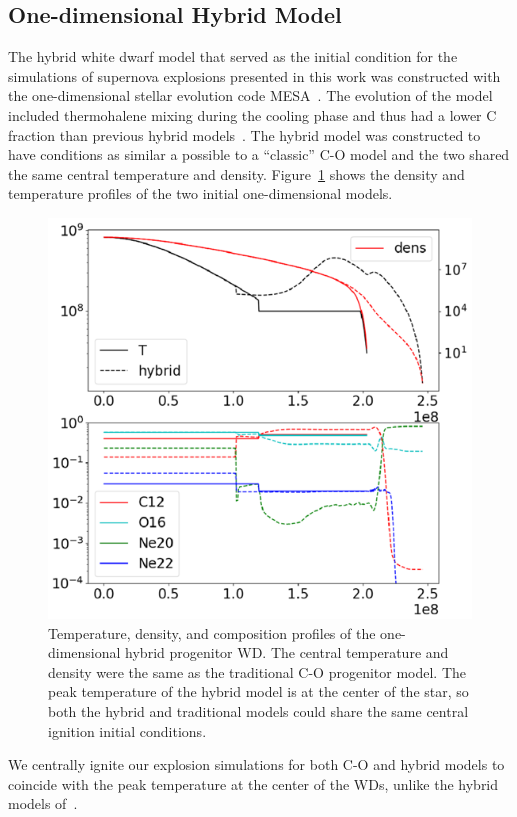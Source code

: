 \documentclass[iop,apj]{emulateapj}
\begin{document}
\subsection{One-dimensional Hybrid Model}

The hybrid white dwarf model that served as the initial condition
for the simulations of supernova explosions presented in this work
was constructed with the one-dimensional stellar evolution code
MESA~\citep{mesa1,mesa2,mesa3,mesa3e}. The evolution of the model
included thermohalene mixing during the cooling phase and thus
had a lower C fraction than previous hybrid models~\citep{brooksetal2017}.
The hybrid model was constructed to have conditions as similar a possible
to a ``classic'' C-O model and the two shared the same central temperature
and density.  Figure~\ref{fig:init_conds} shows the density and temperature
profiles of the two initial one-dimensional models.
\begin{figure}
\includegraphics[width=\columnwidth]{figures/initial_conds.png}
\caption{\label{fig:init_conds}
Temperature, density, and  composition profiles of the one-dimensional hybrid
progenitor WD. The central temperature and density were the same as
the traditional C-O progenitor model.
The peak temperature of the hybrid model is at the center of the star,
so both the hybrid and traditional models could share the same
	central ignition initial conditions.
}
\end{figure}
{\color{blue} We centrally ignite our explosion simulations for both
  C-O and hybrid models to coincide with the peak temperature at the
  center of the WDs, unlike the hybrid models
  of~\citet{willcoxetal2016}.}
\end{document}
